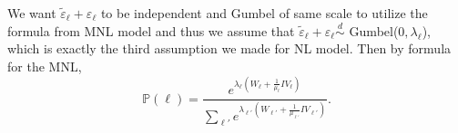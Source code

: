 \documentclass[11pt]{article}
\newcommand{\prob}{\ensuremath{\mathbb{P}}}
\begin{document}
We want $\tilde{\varepsilon}_\ell + \varepsilon_\ell$ to be independent and Gumbel of same scale to utilize the formula from MNL model and thus we assume that $\tilde{\varepsilon}_\ell + \varepsilon_\ell \overset{d}\sim$ Gumbel($0, \lambda_\ell$), which is exactly the third assumption we made for NL model. Then by formula for the MNL,
\begin{equation*}
\prob(\ell) = \frac{e^{\lambda_\ell(W_\ell + \frac{1}{\mu_\ell}IV_\ell)}}{\sum_{\ell'}e^{\lambda_{\ell'}(W_{\ell'} + \frac{1}{\mu_{\ell'}}IV_{\ell'})}}.
\end{equation*}
\end{document}
